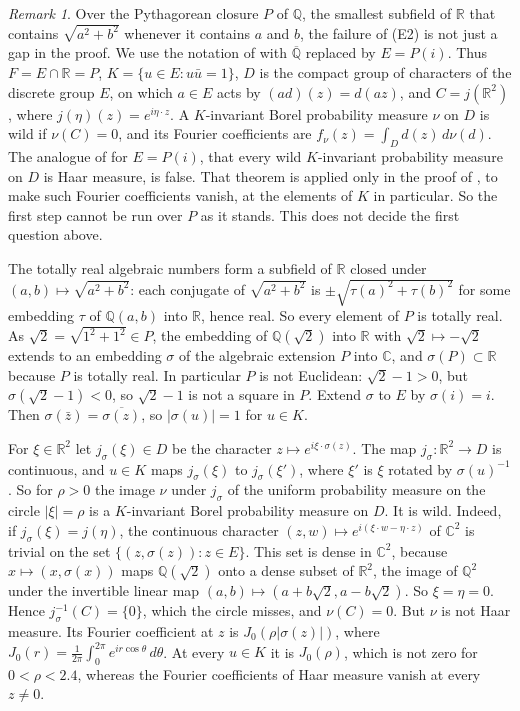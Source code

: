 \documentclass[11pt,a4paper]{amsart}
\theoremstyle{remark}
\newtheorem*{remark}{Remark}
\newcommand{\C}{\mathbb{C}}
\newcommand{\Q}{\mathbb{Q}}
\newcommand{\R}{\mathbb{R}}
\begin{document}
\begin{remark}
Over the Pythagorean closure $P$ of $\Q$, the smallest subfield of $\R$ that contains $\sqrt{a^2+b^2}$ whenever it
contains $a$ and $b$, the failure of (E2) is not just a gap in the proof. We use the notation of
\cite[Def.~2.1 and~2.2]{OpenAI} with $\overline{\Q}$ replaced by $E=P(i)$. Thus $F=E\cap\R=P$,
$K=\{u\in E:u\bar u=1\}$, $D$ is the compact group of characters of the discrete group $E$, on which $a\in E$ acts by
$(ad)(z)=d(az)$, and $C=j(\R^2)$, where $j(\eta)(z)=e^{i\eta\cdot z}$. A $K$-invariant Borel probability measure $\nu$
on $D$ is wild if $\nu(C)=0$, and its Fourier coefficients are $f_\nu(z)=\int_D d(z)\,d\nu(d)$. The analogue of
\cite[Thm.~2.3]{OpenAI} for $E=P(i)$, that every wild $K$-invariant probability measure on $D$ is Haar measure, is
false. That theorem is applied only in the proof of \cite[Prop.~4.2]{OpenAI}, to make such Fourier coefficients
vanish, at the elements of $K$ in particular. So the first step cannot be run over $P$ as it stands. This does not
decide the first question above.

The totally real algebraic numbers form a subfield of $\R$ closed under $(a,b)\mapsto\sqrt{a^2+b^2}$: each conjugate
of $\sqrt{a^2+b^2}$ is $\pm\sqrt{\tau(a)^2+\tau(b)^2}$ for some embedding $\tau$ of $\Q(a,b)$ into $\R$, hence real. So
every element of $P$ is totally real. As $\sqrt2=\sqrt{1^2+1^2}\in P$, the embedding of $\Q(\sqrt2)$ into $\R$ with
$\sqrt2\mapsto-\sqrt2$ extends to an embedding $\sigma$ of the algebraic extension $P$ into $\C$, and $\sigma(P)\subset\R$
because $P$ is totally real. In particular $P$ is not Euclidean: $\sqrt2-1>0$, but $\sigma(\sqrt2-1)<0$, so $\sqrt2-1$
is not a square in $P$. Extend $\sigma$ to $E$ by $\sigma(i)=i$. Then $\sigma(\bar z)=\overline{\sigma(z)}$, so
$|\sigma(u)|=1$ for $u\in K$.

For $\xi\in\R^2$ let $j_\sigma(\xi)\in D$ be the character $z\mapsto e^{i\xi\cdot\sigma(z)}$. The map
$j_\sigma\colon\R^2\to D$ is continuous, and $u\in K$ maps $j_\sigma(\xi)$ to $j_\sigma(\xi')$, where $\xi'$ is $\xi$
rotated by $\sigma(u)^{-1}$. So for $\rho>0$ the image $\nu$ under $j_\sigma$ of the uniform probability measure on the
circle $|\xi|=\rho$ is a $K$-invariant Borel probability measure on $D$. It is wild. Indeed, if $j_\sigma(\xi)=j(\eta)$,
the continuous character $(z,w)\mapsto e^{i(\xi\cdot w-\eta\cdot z)}$ of $\C^2$ is trivial on the set
$\{(z,\sigma(z)):z\in E\}$. This set is dense in $\C^2$, because $x\mapsto(x,\sigma(x))$ maps $\Q(\sqrt2)$ onto a dense
subset of $\R^2$, the image of $\Q^2$ under the invertible linear map $(a,b)\mapsto(a+b\sqrt2,a-b\sqrt2)$. So
$\xi=\eta=0$. Hence $j_\sigma^{-1}(C)=\{0\}$, which the circle misses, and $\nu(C)=0$. But $\nu$ is not Haar measure.
Its Fourier coefficient at $z$ is $J_0(\rho|\sigma(z)|)$, where $J_0(r)=\frac1{2\pi}\int_0^{2\pi}e^{ir\cos\theta}\,
d\theta$. At every $u\in K$ it is $J_0(\rho)$, which is not zero for $0<\rho<2.4$, whereas the Fourier coefficients of
Haar measure vanish at every $z\neq0$.


\end{remark}
\end{document}
